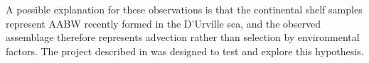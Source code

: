 

A possible explanation for these observations is that the continental shelf samples represent \ac{AABW} recently formed in the D'Urville sea, and the observed assemblage therefore represents advection rather than selection by environmental factors.
The project described in  was designed to test and explore this hypothesis.


